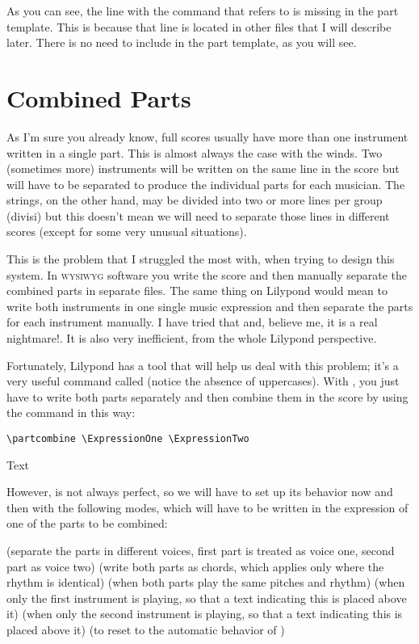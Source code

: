 \documentclass[../../LilyPond-Tutorials]{subfiles}
\begin{document}
As you can see, the line with the  command that refers to  is missing in the part template.
This is because that line is located in other files that I will describe later.
There is no need to include  in the part template, as you will see.


\section{Combined Parts}
\label{sec:combined-parts}

As I'm sure you already know, full scores usually have more than one instrument written in a single part.
This is almost always the case with the winds.
Two (sometimes more) instruments will be written on the same line in the score but will have to be separated to produce the individual parts for each musician.
The strings, on the other hand, may be divided into two or more lines per group (divisi) but this doesn't mean we will need to separate those lines in different scores (except for some very unusual situations).

This is the problem that I struggled the most with, when trying to design this system.
In \textsc{wysiwyg} software you write the score and then manually separate the combined parts in separate files.
The same thing on Lilypond would mean to write both instruments in one single music expression and then separate the parts for each instrument manually.
I have tried that and, believe me, it is a real nightmare!.
It is also very inefficient, from the whole Lilypond perspective.

Fortunately, Lilypond has a tool that will help us deal with this problem; it's a very useful command called  (notice the absence of uppercases).
With , you just have to write both parts separately and then combine them in the score by using the command in this way:

\begin{verbatim}
\partcombine \ExpressionOne \ExpressionTwo
\end{verbatim}

Text

However,  is not always perfect, so we will have to set up its behavior now and then with the following modes, which will have to be written in the expression of one of the parts to be combined: 

 (separate the parts in different voices, first part is treated as voice one, second part as voice two)
 (write both parts as chords, which applies only where the rhythm is identical)
 (when both parts play the same pitches and rhythm)
 (when only the first instrument is playing, so that a text indicating this is placed above it)
 (when only the second instrument is playing, so that a text indicating this is placed above it)
 (to reset to the automatic behavior of )
\end{document}

